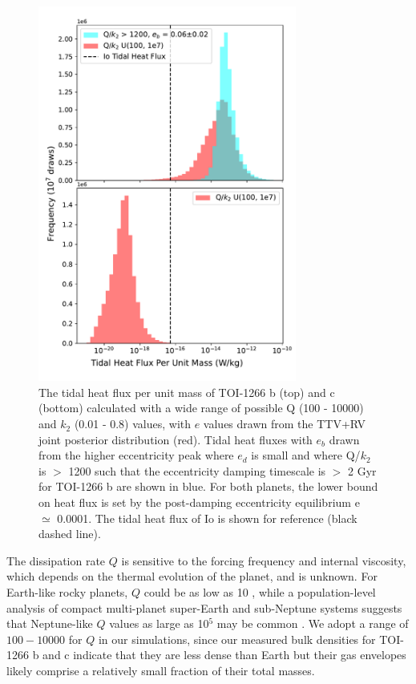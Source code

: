\documentclass[twocolumn]{aastex631}
\begin{document}
\begin{figure}
  \includegraphics[width=8.5cm]{Tidal_Heat_Flux_Fig.pdf}
  \caption{The tidal heat flux per unit mass of TOI-1266 b (top) and c (bottom) calculated with a wide range of possible Q (100 - 10000) and $k_2$ (0.01 - 0.8) values, with $e$ values drawn from the TTV+RV joint posterior distribution (red). Tidal heat fluxes with $e_b$ drawn from the higher eccentricity peak where $e_d$ is small and where Q/$k_2$ is $>$ 1200 such that the eccentricity damping timescale is $>$ 2 Gyr for TOI-1266 b are shown in blue. For both planets, the lower bound on heat flux is set by the post-damping eccentricity equilibrium e $\simeq$ 0.0001. The tidal heat flux of Io is shown for reference (black dashed line).}
  \label{fig:tidal heat plot}
\end{figure}

The dissipation rate $Q$ is sensitive to the forcing frequency and internal viscosity, which depends on the thermal evolution of the planet, and is unknown. For Earth-like rocky planets, $Q$ could be as low as 10 \citep{Clausen2015,Goldreich1996}, while a population-level analysis of compact multi-planet super-Earth and sub-Neptune systems suggests that Neptune-like $Q$ values as large as 10$^5$ may be common \citep{Louden2023}. We adopt a range of $100 - 10000$ for $Q$ in our simulations, since our measured bulk densities for TOI-1266 b and c indicate that they are less dense than Earth but their gas envelopes likely comprise a relatively small fraction of their total masses.
\end{document}
